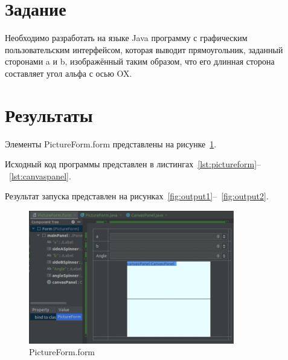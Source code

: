 \documentclass[a4paper, 14pt]{extarticle}
\begin{document}
\renewcommand{\ttdefault}{pcr}

\setlength{\tabcolsep}{3pt}
\newpage
\setcounter{page}{2}

\section{Задание}\label{Sect::task}

Необходимо разработать на языке Java программу с графическим пользовательским интерфейсом, которая выводит прямоугольник, заданный сторонами a и b, изображённый таким образом, что его длинная сторона составляет угол альфа с осью OX.


\section{Результаты}\label{Sect::res}

Элементы PictureForm.form представлены на рисунке~\ref{fig:form}.

Исходный код программы представлен в листингах~\ref{lst:pictureform}--~\ref{lst:canvaspanel}.

Результат запуска представлен на рисунках~\ref{fig:output1}--~\ref{fig:output2}.


\begin{figure}[!htb]
	\centering
	\includegraphics[width=0.8\textwidth]{form.png}
\caption{PictureForm.form}
\label{fig:form}
\end{figure}
\end{document}
